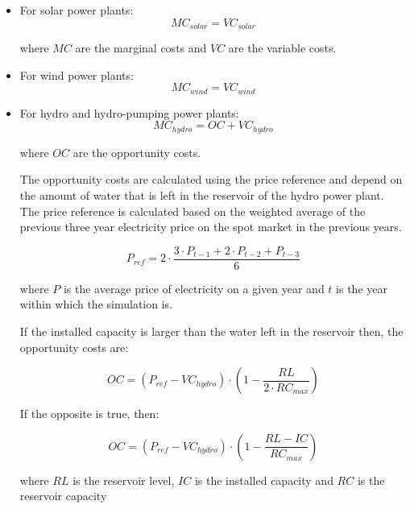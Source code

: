 \begin{itemize}

\item For solar power plants:
\begin{equation}
MC_{solar} = VC_{solar}
\end{equation}

where $MC$ are the marginal costs and $VC$ are the variable costs.

\item For wind power plants:
\begin{equation}
MC_{wind} = VC_{wind}
\end{equation}

\item For hydro and hydro-pumping power plants:
\begin{equation}
MC_{hydro} = OC + VC_{hydro}
\end{equation}

where $OC$ are the opportunity costs.

The opportunity costs are calculated using the price reference and depend on the amount of water that is left in the reservoir of the hydro power plant. The price reference is calculated based on the weighted average of the previous three year electricity price on the spot market in the previous years.

\begin{equation}
P_{ref} = 2 \cdot \frac{3\cdot P_{t-1} + 2\cdot P_{t-2} + P_{t-3}}{6}
\end{equation}

where $P$ is the average price of electricity on a given year and $t$ is the year within which the simulation is.

If the installed capacity is larger than the water left in the reservoir then, the opportunity costs are:

\begin{equation}
OC = (P_{ref} - VC_{hydro}) \cdot \left(1 - \frac{RL}{2 \cdot RC_{max}}\right)
\end{equation}

If the opposite is true, then:

\begin{equation}
OC = (P_{ref}  - VC_{hydro}) \cdot \left(1 - \frac{RL - IC}{RC_{max}}\right)
\end{equation}

where $RL$ is the reservoir level, $IC$ is the installed capacity and $RC$ is the reservoir capacity


\end{itemize}
